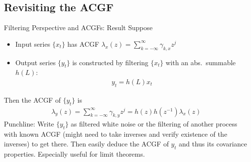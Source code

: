 \documentclass[aspectratio=169, handout]{beamer}
\newcommand{\vc}{\operatorname{vec}}
\newcommand{\Var}{\operatorname{Var}}
\begin{document}

\subsection{Revisiting the ACGF}

{\footnotesize
\begin{frame}{Filtering Perspective and ACGFs: Result}
Suppose
\begin{itemize}
  \item Input series $\{x_t\}$ has ACGF
    $\lambda_x(z)=\sum_{k=-\infty}^\infty \gamma_{k,x} z^j$
  \item Output series $\{y_t\}$ is constructed by filtering $\{x_t\}$
    with an abs.\ summable $h(L)$:
    \begin{align*}
      y_t = h(L)x_t
    \end{align*}
\end{itemize}
\pause
Then the ACGF of $\{y_t\}$ is
\begin{align*}
  \lambda_y(z)
  = \sum_{k=-\infty}^\infty \gamma_{k,y} z^j
  = h(z)h(z^{-1})\lambda_x(z)
\end{align*}
\pause
\alert{Punchline}:
Write $\{y_t\}$ as filtered white noise or the filtering of another
process with known ACGF (might need to take inverses and verify
existence of the inverses) to get there.
Then easily deduce the ACGF of $y_t$ and thus its covariance properties.
Especially useful for limit theorems.
\end{frame}
}
\end{document}
